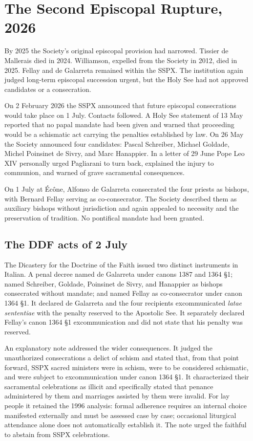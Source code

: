\section{The Second Episcopal Rupture, 2026}

By 2025 the Society's original episcopal provision had narrowed. Tissier de Mallerais died in 2024. Williamson, expelled from the Society in 2012, died in 2025. Fellay and de Galarreta remained within the SSPX. The institution again judged long-term episcopal succession urgent, but the Holy See had not approved candidates or a consecration.

On 2 February 2026 the SSPX announced that future episcopal consecrations would take place on 1 July. Contacts followed. A Holy See statement of 13 May reported that no papal mandate had been given and warned that proceeding would be a schismatic act carrying the penalties established by law. On 26 May the Society announced four candidates: Pascal Schreiber, Michael Goldade, Michel Poinsinet de Sivry, and Marc Hanappier. In a letter of 29 June Pope Leo XIV personally urged Pagliarani to turn back, explained the injury to communion, and warned of grave sacramental consequences.

On 1 July at Écône, Alfonso de Galarreta consecrated the four priests as bishops, with Bernard Fellay serving as co-consecrator. The Society described them as auxiliary bishops without jurisdiction and again appealed to necessity and the preservation of tradition. No pontifical mandate had been granted.

\subsection{The DDF acts of 2 July}

The Dicastery for the Doctrine of the Faith issued two distinct instruments in Italian. A penal decree named de Galarreta under canons 1387 and 1364 §1; named Schreiber, Goldade, Poinsinet de Sivry, and Hanappier as bishops consecrated without mandate; and named Fellay as co-consecrator under canon 1364 §1. It declared de Galarreta and the four recipients excommunicated \emph{latae sententiae} with the penalty reserved to the Apostolic See. It separately declared Fellay's canon 1364 §1 excommunication and did not state that his penalty was reserved.

An explanatory note addressed the wider consequences. It judged the unauthorized consecrations a delict of schism and stated that, from that point forward, SSPX sacred ministers were in schism, were to be considered schismatic, and were subject to excommunication under canon 1364 §1. It characterized their sacramental celebrations as illicit and specifically stated that penance administered by them and marriages assisted by them were invalid. For lay people it retained the 1996 analysis: formal adherence requires an internal choice manifested externally and must be assessed case by case; occasional liturgical attendance alone does not automatically establish it. The note urged the faithful to abstain from SSPX celebrations.

